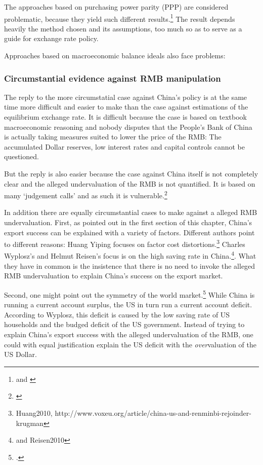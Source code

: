 The approaches based on purchasing power parity (PPP) are considered problematic, because they yield such different results.\footnote{\cite[p. 16]{Yu2010} and \cite[pp. 82]{CheungChinn2010}} The result depends heavily the method chosen and its assumptions, too much so as to serve as a guide for exchange rate policy.

Approaches based on macroeconomic balance ideals also face problems: 



\subsubsection{Circumstantial evidence against RMB manipulation}

The reply to the more circumstatial case against China's policy is at the same time more difficult and easier to make than the case against estimations of the equilibrium exchange rate. It is difficult because the case is based on textbook macroeconomic reasoning and nobody disputes that the People's Bank of China is actually taking measures suited to lower the price of the RMB: The accumulated Dollar reserves, low interest rates and capital controls cannot be questioned.

But the reply is also easier because the case against China itself is not completely clear and the alleged undervaluation of the RMB is not quantified. It is based on many  `judgement calls' and as such it is vulnerable.\footnote{\cite[p. 85]{CheungChinnFujii2010}}

In addition there are equally circumstantial cases to make against a alleged RMB undervaluation. First, as pointed out in the first section of this chapter, China's export success can be explained with a variety of factors.  Different authors point to different reasons: Huang Yiping focuses on factor cost distortions.\footnote{Huang2010, http://www.voxeu.org/article/china-us-and-renminbi-rejoinder-krugman} Charles Wyplosz's and Helmut Reisen's focus is on the high saving rate in China.\footnote{\cite[pp. 40]{Wyplosz2010} and \cite{p. 65}{Reisen2010}}. What they have in common is the insistence that there is no need to invoke the alleged RMB undervaluation to explain China's success on the export market.

Second, one might point out the symmetry of the world market.\footnote{\cite[pp. 39-40]{Wyplosz2010}.} While China is running a current account surplus, the US in turn run a current account deficit. According to Wyplosz, this deficit is caused by the low saving rate of US households and the budged deficit of the US government. Instead of trying to explain China's export success with the alleged undervaluation of the RMB, one could with equal justification explain the US deficit with the \emph{over}valuation of the US Dollar. 

